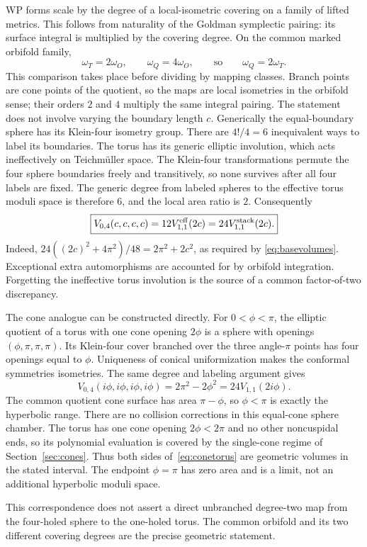 WP forms scale by the degree of a local-isometric covering on a family of
lifted metrics. This follows from naturality of the Goldman symplectic
pairing: its surface integral is multiplied by the covering degree.
On the common marked orbifold family,
\[
 \omega_T=2\omega_O,\qquad \omega_Q=4\omega_O,
 \qquad\text{so}\qquad\omega_Q=2\omega_T.
\]
This comparison takes place before dividing by mapping classes. Branch
points are cone points of the quotient, so the maps are local isometries
in the orbifold sense; their orders $2$ and $4$ multiply the same integral
pairing. The statement does not involve varying the boundary length $c$.
Generically the equal-boundary sphere has its Klein-four isometry group.
There are $4!/4=6$ inequivalent ways to label its boundaries. The torus has
its generic elliptic involution, which acts ineffectively on Teichm\"uller
space. The Klein-four transformations permute the four sphere boundaries
freely and transitively, so none survives after all four labels are fixed.
The generic degree from labeled spheres to the effective torus moduli
space is therefore $6$, and the local area ratio is $2$. Consequently
\begin{equation}
 \boxed{
 V_{0,4}(c,c,c,c)=12V_{1,1}^{\rm eff}(2c)
                =24V_{1,1}^{\rm stack}(2c).}
 \label{eq:voltorussphere}
\end{equation}
Indeed, $24((2c)^2+4\pi^2)/48=2\pi^2+2c^2$, as required by
\eqref{eq:basevolumes}. Exceptional extra automorphisms are accounted for
by orbifold integration. Forgetting the ineffective torus involution is
the source of a common factor-of-two discrepancy.

The cone analogue can be constructed directly. For $0<\phi<\pi$, the
elliptic quotient of a torus with one cone opening $2\phi$ is a sphere
with openings $(\phi,\pi,\pi,\pi)$. Its Klein-four cover branched over
the three angle-$\pi$ points has four openings equal to $\phi$. Uniqueness
of conical uniformization makes the conformal symmetries isometries.
The same degree and labeling argument gives
\begin{equation}
 V_{0,4}(i\phi,i\phi,i\phi,i\phi)
   =2\pi^2-2\phi^2=24V_{1,1}(2i\phi).
 \label{eq:conetorus}
\end{equation}
The common quotient cone surface has area $\pi-\phi$, so $\phi<\pi$ is exactly the
hyperbolic range. There are no collision corrections in this equal-cone
sphere chamber.
The torus has one cone opening $2\phi<2\pi$ and no other noncuspidal
ends, so its polynomial evaluation is covered by the single-cone regime
of Section~\ref{sec:cones}. Thus both sides of~\eqref{eq:conetorus} are
geometric volumes in the stated interval. The endpoint $\phi=\pi$ has
zero area and is a limit, not an additional hyperbolic moduli space.

This correspondence does not assert a direct unbranched degree-two map
from the four-holed sphere to the one-holed torus. The common orbifold and
its two different covering degrees are the precise geometric statement.

